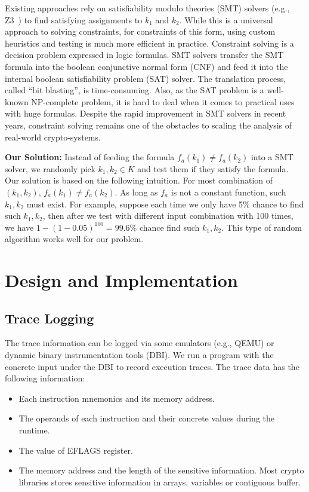 Existing approaches rely on satisfiability modulo theories (SMT) solvers
(e.g., Z3~\cite{DeMoura:2008:ZES:1792734.1792766}) to find satisfying assignments to
$k_1$ and $k_2$.
While this is a universal approach to solving constraints,
for constraints of this form, using custom
heuristics and testing is much more efficient in practice. Constraint
solving is a decision problem expressed in logic formulas. SMT solvers
transfer the SMT formula into the boolean conjunctive normal
form (CNF) and feed it into the internal boolean satisfiability
problem (SAT) solver. The translation process, called ``bit blasting'',
is time-consuming. Also, as the SAT problem is a well-known NP-complete
problem, it is hard to deal when it comes to
practical uses with huge formulas. Despite the rapid improvement
in SMT solvers in recent years, constraint solving remains one of
the obstacles to scaling the analysis of real-world crypto-systems.

\textbf{Our Solution:}
Instead of feeding the formula $f_a(k_1) \neq f_a(k_2)$ into a SMT solver, we
randomly pick $k_1, k_2 \in K$ and test them if they satisfy the
formula. Our solution is based on the following intuition. For most combination
of $(k_{1}, k_{2} )$, $f_a(k_1) \neq f_a(k_2)$. As long as
$f_a$ is not a constant function, such $k_1, k_2$ must exist. For example,
suppose each time we only have 5\% chance to find such $k_1, k_2$, then after we
test with different input combination with 100 times, we have $1 -
  (1-0.05)^{100} = 99.6\%$ chance find such $k_1, k_2$. This type of random algorithm
works well for our problem.

\section{Design and Implementation}
\subsection{Trace Logging}
The trace information can be logged via some emulators (e.g., QEMU) or dynamic binary instrumentation tools (DBI).
We run a program with the concrete input under the DBI to record execution traces.
The trace data has the following information:
\begin{itemize}
  \item Each instruction mnemonics and its memory address.
  \item The operands of each instruction and their concrete values during the runtime.
  \item The value of EFLAGS register.
  \item The memory address and the length of the sensitive information.
        Most crypto libraries stores sensitive information in arrays,
        variables or contiguous buffer.
\end{itemize}

